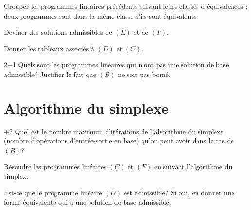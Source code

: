 \documentclass[11pt,a4paper]{article}
\begin{document}
\begin{question}{3}
  Grouper les programmes linéaires précédents suivant leurs classes
  d'équivalences ; deux programmes sont dans la même classe s'ils sont
  équivalents.
\end{question}

\begin{question}{1}
  Deviner des solutions admissibles de $(E)$ et de $(F)$.
\end{question}

\begin{question}{1}
  Donner les tableaux associés à $(D)$ et $(C)$.
\end{question}

\begin{question}{2+1}
  Quels sont les programmes linéaires qui n'ont pas une solution de
  base admissible? Justifier le fait que $(B)$ ne soit pas borné.
\end{question}

\section{Algorithme du simplexe}

\begin{question}{+2}
  Quel est le nombre maximum d'itérations de l'algorithme du simplexe
  (nombre d'opérations d'entrée-sortie en base) qu'on peut avoir dans
  le cas de $(B)$?
\end{question}

\begin{question}{7}
  Résoudre les programmes linéaires $(C)$ et $(F)$ en suivant
  l'algorithme du simplex.
\end{question}

\begin{question}{6}
  Est-ce que le programme linéaire $(D)$ est admissible? Si oui, en
  donner une forme équivalente qui a une solution de base admissible.
\end{question}
\end{document}
